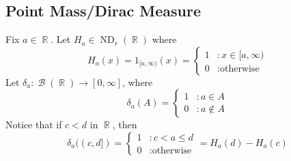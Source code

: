 \documentclass[12pt, a4paper]{memoir}
\DeclareMathOperator{\R}{{\mathbb{R}}}
\theoremstyle{nonumberplain}
\DeclareMathOperator{\B}{\mathcal{B}}
\DeclareMathOperator{\ND}{ND}
\begin{document}
\subsection{Point Mass/Dirac Measure}
Fix $a\in\R$.
Let $H_a\in\ND_r(\R)$ where
\begin{equation*}
    H_a(x)=1_{[a,\infty)}(x)=\begin{cases}1&:x\in[a,\infty)\\0&:\text{otherwise}\end{cases}
\end{equation*}
Let $\delta_a:\B(\R)\to[0,\infty]$, where
\begin{equation*}
    \delta_a(A)=\begin{cases}1&:a\in A\\0&:a\notin A\end{cases}
\end{equation*}
Notice that if $c<d$ in $\R$, then
\begin{equation*}
    \delta_a((c,d])=\begin{cases}1 &:c<a\leq d\\0&:\text{otherwise}\end{cases}=H_a(d)-H_a(c) %
\end{equation*}
\end{document}
